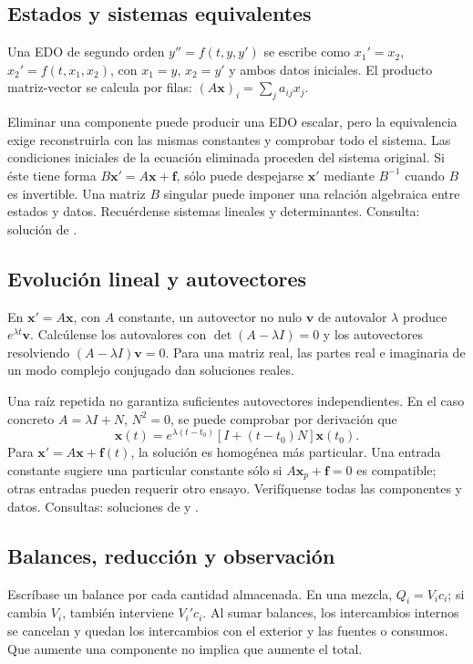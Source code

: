 %
\subsection*{Estados y sistemas equivalentes}
\label{CH07-B01}
Una EDO de segundo orden $y''=f(t,y,y')$ se escribe como
$x_1'=x_2$, $x_2'=f(t,x_1,x_2)$, con $x_1=y$, $x_2=y'$ y ambos
datos iniciales. El producto matriz-vector se calcula por filas:
$(A\mathbf x)_i=\sum_j a_{ij}x_j$.

Eliminar una componente puede producir una EDO escalar, pero la
equivalencia exige reconstruirla con las mismas constantes y comprobar
todo el sistema. Las condiciones iniciales de la ecuación eliminada
proceden del sistema original. Si éste tiene forma
$B\mathbf x'=A\mathbf x+\mathbf f$, sólo puede despejarse
$\mathbf x'$ mediante $B^{-1}$ cuando $B$ es invertible. Una matriz
$B$ singular puede imponer una relación algebraica entre estados y datos.
Recuérdense sistemas lineales y determinantes.
Consulta: solución de .

%
\subsection*{Evolución lineal y autovectores}
\label{CH07-B02}
En $\mathbf x'=A\mathbf x$, con $A$ constante, un autovector no nulo
$\mathbf v$ de autovalor $\lambda$ produce
$e^{\lambda t}\mathbf v$. Calcúlense los autovalores con
$\det(A-\lambda I)=0$ y los autovectores resolviendo
$(A-\lambda I)\mathbf v=0$. Para una matriz real, las partes real e
imaginaria de un modo complejo conjugado dan soluciones reales.

Una raíz repetida no garantiza suficientes autovectores independientes.
En el caso concreto $A=\lambda I+N$, $N^2=0$, se puede comprobar por
derivación que
\[
 \mathbf x(t)=e^{\lambda(t-t_0)}
 [I+(t-t_0)N]\mathbf x(t_0).
\]
Para $\mathbf x'=A\mathbf x+\mathbf f(t)$, la solución es homogénea
más particular. Una entrada constante sugiere una particular constante
sólo si $A\mathbf x_p+\mathbf f=0$ es compatible; otras entradas
pueden requerir otro ensayo. Verifíquense todas las componentes y datos.
Consultas: soluciones de  y .

%
\subsection*{Balances, reducción y observación}
\label{CH07-B03}
Escríbase un balance por cada cantidad almacenada. En una mezcla,
$Q_i=V_i c_i$; si cambia $V_i$, también interviene $V_i'c_i$.
Al sumar balances, los intercambios internos se cancelan y quedan los
intercambios con el exterior y las fuentes o consumos. Que aumente una
componente no implica que aumente el total.

